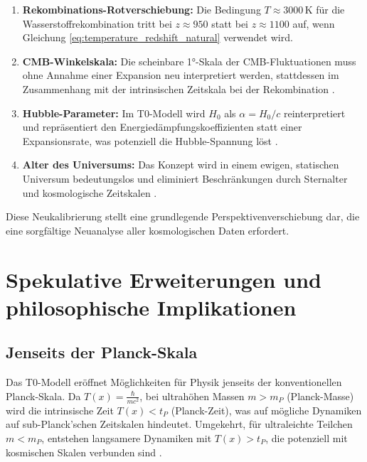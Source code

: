 \documentclass[12pt,a4paper]{article}
\newcommand{\Tfield}{T(x)}
\begin{document}
	\begin{enumerate}
		\item \textbf{Rekombinations-Rotverschiebung:} Die Bedingung \(T \approx 3000 \, \text{K}\) für die Wasserstoffrekombination tritt bei \(z \approx 950\) statt bei \(z \approx 1100\) auf, wenn Gleichung \ref{eq:temperature_redshift_natural} verwendet wird.
		
		\item \textbf{CMB-Winkelskala:} Die scheinbare 1°-Skala der CMB-Fluktuationen muss ohne Annahme einer Expansion neu interpretiert werden, stattdessen im Zusammenhang mit der intrinsischen Zeitskala bei der Rekombination \cite{pascher_vereinheitlichung_2025}.
		
		\item \textbf{Hubble-Parameter:} Im T0-Modell wird \(H_0\) als \(\alpha = H_0/c\) reinterpretiert und repräsentiert den Energiedämpfungskoeffizienten statt einer Expansionsrate, was potenziell die Hubble-Spannung löst \cite{pascher_params_2025}.
		
		\item \textbf{Alter des Universums:} Das Konzept wird in einem ewigen, statischen Universum bedeutungslos und eliminiert Beschränkungen durch Sternalter und kosmologische Zeitskalen \cite{pascher_perspective_2025}.
	\end{enumerate}
	
	Diese Neukalibrierung stellt eine grundlegende Perspektivenverschiebung dar, die eine sorgfältige Neuanalyse aller kosmologischen Daten erfordert.
	
	\section{Spekulative Erweiterungen und philosophische Implikationen}
	\label{sec:beyond_limits}
	
	\subsection{Jenseits der Planck-Skala}
	\label{subsec:beyond_planck}
	
	Das T0-Modell eröffnet Möglichkeiten für Physik jenseits der konventionellen Planck-Skala. Da \(\Tfield = \frac{\hbar}{mc^2}\), bei ultrahöhen Massen \(m > m_P\) (Planck-Masse) wird die intrinsische Zeit \(\Tfield < t_P\) (Planck-Zeit), was auf mögliche Dynamiken auf sub-Planck'schen Zeitskalen hindeutet. Umgekehrt, für ultraleichte Teilchen \(m < m_P\), entstehen langsamere Dynamiken mit \(\Tfield > t_P\), die potenziell mit kosmischen Skalen verbunden sind \cite{pascher_planck_2025}.
	
\end{document}
